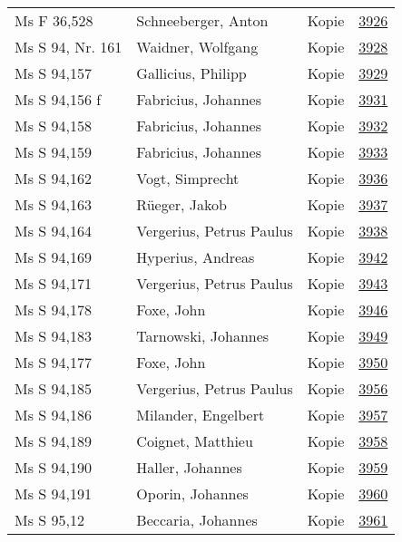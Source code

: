 \documentclass[10pt,a4paper,landscape]{report}
\begin{document}
\begin{longtable}{p{16cm}p{4cm}lr}
Ms F 36,528	&	Schneeberger, Anton	&	Kopie	&	\href{http://130.60.24.72/assignment/3926}{3926}\\
Ms S 94, Nr. 161	&	Waidner, Wolfgang	&	Kopie	&	\href{http://130.60.24.72/assignment/3928}{3928}\\
Ms S 94,157	&	Gallicius, Philipp	&	Kopie	&	\href{http://130.60.24.72/assignment/3929}{3929}\\
Ms S 94,156 f	&	Fabricius, Johannes	&	Kopie	&	\href{http://130.60.24.72/assignment/3931}{3931}\\
Ms S 94,158	&	Fabricius, Johannes	&	Kopie	&	\href{http://130.60.24.72/assignment/3932}{3932}\\
Ms S 94,159	&	Fabricius, Johannes	&	Kopie	&	\href{http://130.60.24.72/assignment/3933}{3933}\\
Ms S 94,162	&	Vogt, Simprecht	&	Kopie	&	\href{http://130.60.24.72/assignment/3936}{3936}\\
Ms S 94,163	&	Rüeger, Jakob	&	Kopie	&	\href{http://130.60.24.72/assignment/3937}{3937}\\
Ms S 94,164	&	Vergerius, Petrus Paulus	&	Kopie	&	\href{http://130.60.24.72/assignment/3938}{3938}\\
Ms S 94,169	&	Hyperius, Andreas	&	Kopie	&	\href{http://130.60.24.72/assignment/3942}{3942}\\
Ms S 94,171	&	Vergerius, Petrus Paulus	&	Kopie	&	\href{http://130.60.24.72/assignment/3943}{3943}\\
Ms S 94,178	&	Foxe, John	&	Kopie	&	\href{http://130.60.24.72/assignment/3946}{3946}\\
Ms S 94,183	&	Tarnowski, Johannes	&	Kopie	&	\href{http://130.60.24.72/assignment/3949}{3949}\\
Ms S 94,177	&	Foxe, John	&	Kopie	&	\href{http://130.60.24.72/assignment/3950}{3950}\\
Ms S 94,185	&	Vergerius, Petrus Paulus	&	Kopie	&	\href{http://130.60.24.72/assignment/3956}{3956}\\
Ms S 94,186	&	Milander, Engelbert	&	Kopie	&	\href{http://130.60.24.72/assignment/3957}{3957}\\
Ms S 94,189	&	Coignet, Matthieu	&	Kopie	&	\href{http://130.60.24.72/assignment/3958}{3958}\\
Ms S 94,190	&	Haller, Johannes	&	Kopie	&	\href{http://130.60.24.72/assignment/3959}{3959}\\
Ms S 94,191	&	Oporin, Johannes	&	Kopie	&	\href{http://130.60.24.72/assignment/3960}{3960}\\
Ms S 95,12	&	Beccaria, Johannes	&	Kopie	&	\href{http://130.60.24.72/assignment/3961}{3961}\\

\end{longtable}
\end{document}
